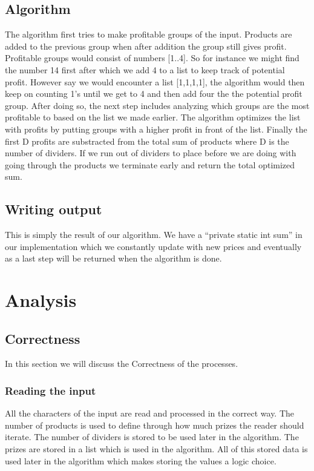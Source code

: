 \documentclass{article}
\begin{document}
\subsection{Algorithm}
The algorithm first tries to make profitable groups of the input. Products are added to the previous group when after addition the group still gives profit. Profitable groups would consist of numbers [1..4]. So for instance we might find the number 14 first after which we add 4 to a list to keep track of potential profit. However say we would encounter a list [1,1,1,1], the algorithm would then keep on counting 1's until we get to 4 and then add four the the potential profit group.
\newline
\newline
After doing so, the next step includes analyzing which groups are the most profitable to based on the list we made earlier. The algorithm optimizes the list with profits by putting groups with a higher profit in front of the list.
\newline
\newline
Finally the first D profits are substracted from the total sum of products where D is the number of dividers. If we run out of dividers to place before we are doing with going through the products we terminate early and return the total optimized sum.

\subsection{Writing output}
This is simply the result of our algorithm. We have a ``private static int sum'' in our implementation which we constantly update with new prices and eventually as a last step will be returned when the algorithm is done.

\newpage
\section{Analysis}

\subsection{Correctness}
In this section we will discuss the Correctness of the processes.

\subsubsection{Reading the input}
All the characters of the input are read and processed in the correct way. The number of products is used to define through how much prizes the reader should iterate. The number of dividers is stored to be used later in the algorithm. The prizes are stored in a list which is used in the algorithm. All of this stored data is used later in the algorithm which makes storing the values a logic choice.
\end{document}
